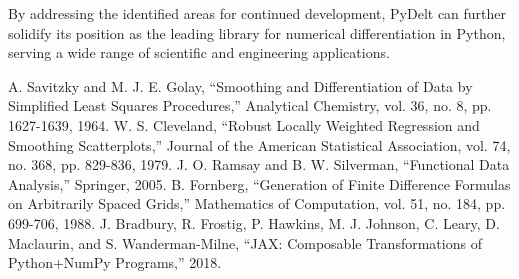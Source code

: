 \documentclass[conference]{IEEEtran}
\begin{document}
By addressing the identified areas for continued development, PyDelt can further solidify its position as the leading library for numerical differentiation in Python, serving a wide range of scientific and engineering applications.

\begin{thebibliography}{00}
 A. Savitzky and M. J. E. Golay, ``Smoothing and Differentiation of Data by Simplified Least Squares Procedures,'' Analytical Chemistry, vol. 36, no. 8, pp. 1627-1639, 1964.
 W. S. Cleveland, ``Robust Locally Weighted Regression and Smoothing Scatterplots,'' Journal of the American Statistical Association, vol. 74, no. 368, pp. 829-836, 1979.
 J. O. Ramsay and B. W. Silverman, ``Functional Data Analysis,'' Springer, 2005.
 B. Fornberg, ``Generation of Finite Difference Formulas on Arbitrarily Spaced Grids,'' Mathematics of Computation, vol. 51, no. 184, pp. 699-706, 1988.
 J. Bradbury, R. Frostig, P. Hawkins, M. J. Johnson, C. Leary, D. Maclaurin, and S. Wanderman-Milne, ``JAX: Composable Transformations of Python+NumPy Programs,'' 2018.
\end{thebibliography}
\end{document}
